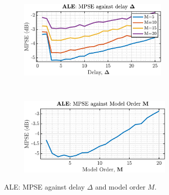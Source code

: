 \begin{enumerate}[label=\alph*), leftmargin=*]
\begin{figure}[h]
    \centering
    \begin{subfigure}{0.49\textwidth}
        \centering
        \includegraphics[height=1.5in]{report/adaptive-signal-processing/adaptive-noise-cancellation/assets/b/ale_mpse_vs_Delta}
    \end{subfigure}
    ~
    \begin{subfigure}{0.49\textwidth}
        \centering
        \includegraphics[height=1.5in]{report/adaptive-signal-processing/adaptive-noise-cancellation/assets/b/ale_mpse_vs_M}
    \end{subfigure}
    \caption{ALE: MPSE against delay $\Delta$ and model order $M$.}
    \label{fig:3_3_b_1}
\end{figure}


\end{enumerate}
